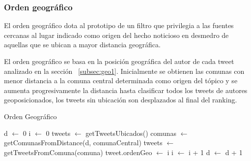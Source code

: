 \subsubsection{Orden geográfico} \label{ordenGeoIndex}

El orden geográfico dota al prototipo de un filtro que privilegia a las fuentes cercanas al lugar indicado como origen del hecho noticioso en desmedro de aquellas que se ubican a mayor distancia geográfica.

El orden geográfico se basa en la posición geográfica del autor de cada tweet analizado  en la sección ~\ref{subsec:geo1}. Inicialmente se obtienen las comunas con menor distancia a la comuna central determinada como origen del tópico y se aumenta progresivamente la distancia hasta clasificar todos los tweets de autores geoposicionados, los tweets sin ubicación son desplazados al final del ranking. 

\begin{algorithm}[H]
	\caption{Orden Geográfico}\label{OrdenGeo}
	\begin{algorithmic}[H]
		\State d $\gets$ 0
		\State i $\gets$ 0
		\State tweets $\gets$ getTweetsUbicados()
			\State comunas $\gets$ getComunasFromDistance(d, comunaCentral)
				\State tweets $\gets$ getTweetsFromComuna(comuna)
					 \State tweet.ordenGeo $\gets$ i
					 \State i $\gets$ i + 1
				\EndFor
			\EndFor
			\State d $\gets$ d + 1
		\EndWhile
		\EndFunction	
	\end{algorithmic}
\end{algorithm}
